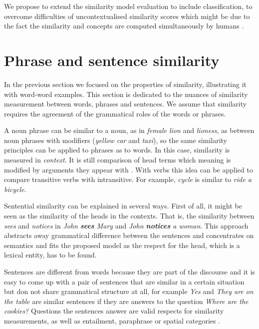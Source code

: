 \documentclass[11pt]{article}
\begin{document}
We propose to extend the similarity model evaluation to include classification, to overcome difficulties of uncontextualised similarity scores which might be due to the fact the similarity and concepts are computed simultaneously by humans \cite{hahn1997concepts}.

\section{Phrase and sentence similarity}

In the previous section we focused on the properties of similarity, illustrating it with word-word examples. This section is dedicated to the nuances of similarity measurement between words, phrases and sentences. We assume that similarity requires the agreement of the grammatical roles of the words or phrases.

A noun phrase can be similar to a noun, as in \textit{female lion} and \textit{lioness}, as between noun phrases with modifiers (\textit{yellow car} and \textit{taxi}), so the same similarity principles can be applied to phrases as to words. In this case, similarity is measured in \emph{context}. It is still comparison of head terms which meaning is modified by arguments they appear with \cite{Dinu:2010:MDS:1870658.1870771,mitchell2010composition}. With verbs this idea can be applied to compare transitive verbs with intransitive. For example, \textit{cycle} is similar to \textit{ride a bicycle}.

Sentential similarity can be explained in several ways. First of all, it might be seen as the similarity of the heads in the contexts. That is, the similarity between \textit{sees} and \textit{notices} in \textit{John \textbf{sees} Mary} and \textit{John \textbf{notices} a woman}. This approach abstracts away grammatical difference between the sentences and concentrates on semantics and fits the proposed model as the respect for the head, which is a lexical entity, has to be found.

Sentences are different from words because they are part of the discourse and it is easy to come up with a pair of sentences that are similar in a certain situation but don not share grammatical structure at all, for example \textit{Yes} and \textit{They are on the table} are similar sentences if they are answers to the question \textit{Where are the cookies?} Questions the sentences answer are valid respects for similarity measurements, as well as entailment, paraphrase \cite{White:2015:WSE:2838931.2838932} or spatial categories \cite{ritter-EtAl:2015:*SEM2015}.
\end{document}
